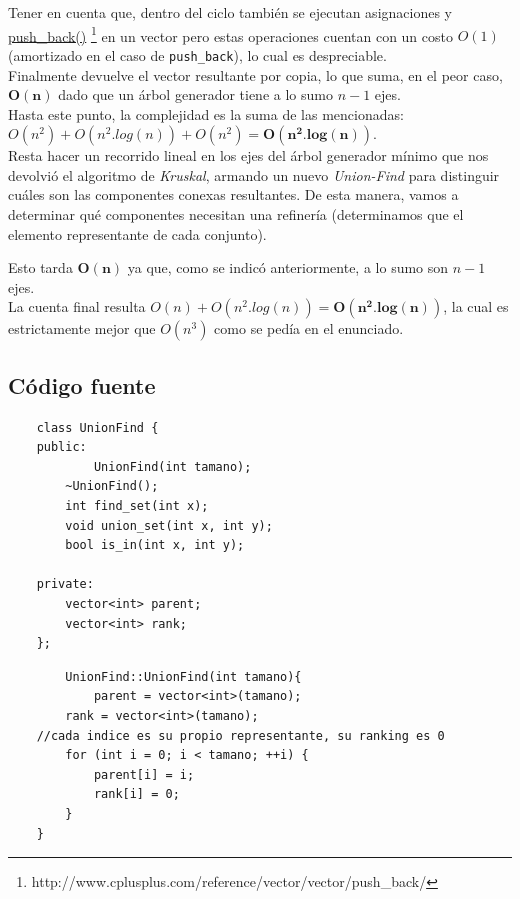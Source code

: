 	Tener en cuenta que, dentro del ciclo tambi\'en se ejecutan asignaciones y \href{http://www.cplusplus.com/reference/vector/vector/push_back/}{push\_back()} \footnote{http://www.cplusplus.com/reference/vector/vector/push_back/} en un vector pero estas operaciones cuentan con un costo $O(1)$ (amortizado en el caso de \texttt{push\_back}), lo cual es despreciable.\\

	Finalmente devuelve el vector resultante por copia, lo que suma, en el peor caso, $\mathbf{O(n)}$ dado que un \'arbol generador tiene a lo sumo $n-1$ ejes.\\

	Hasta este punto, la complejidad es la suma de las mencionadas:  $ O(n^2) + O(n^2.log(n)) + O(n^2) = \mathbf{O(n^2.log(n))}$.\\

	Resta hacer un recorrido lineal en los ejes del \'arbol generador m\'inimo que nos devolvi\'o el algoritmo de \textit{Kruskal}, armando un nuevo \textit{Union-Find} para distinguir cu\'ales son las componentes conexas resultantes. De esta manera, vamos a determinar 	qu\'e componentes necesitan una refiner\'ia (determinamos que el elemento representante de cada conjunto).
		
	 Esto tarda $\mathbf{O(n)}$ ya que, como se indic\'o anteriormente, a lo sumo son $n-1$ ejes.\\

	La cuenta final resulta $O(n) + O(n^2.log(n)) = \mathbf{O(n^2.log(n))}$, la cual es estrictamente mejor que $O(n^3)$ como se ped\'ia en el enunciado.


\newpage
\subsection{C\'odigo fuente}

	\begin{codesnippet}
	\begin{verbatim}
    class UnionFind {
    public:
        	UnionFind(int tamano);
        ~UnionFind();
        int find_set(int x);
        void union_set(int x, int y);
        bool is_in(int x, int y);

    private:
        vector<int> parent;
        vector<int> rank;
    };
	\end{verbatim}
	\end{codesnippet}

	\begin{codesnippet}
	\begin{verbatim}
    	UnionFind::UnionFind(int tamano){
        	parent = vector<int>(tamano);
        rank = vector<int>(tamano);
    //cada indice es su propio representante, su ranking es 0
        for (int i = 0; i < tamano; ++i) {
            parent[i] = i;
            rank[i] = 0;
        }
    }
	\end{verbatim}
	\end{codesnippet}

